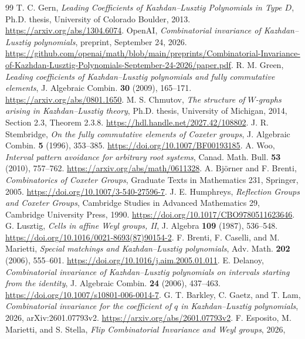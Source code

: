 \documentclass[11pt]{article}
\theoremstyle{definition}\newtheorem{definition}[theorem]{Definition}
\theoremstyle{remark}\newtheorem{remark}[theorem]{Remark}
\begin{document}
\begin{thebibliography}{99}
 T. C. Gern, \emph{Leading Coefficients of
Kazhdan--Lusztig Polynomials in Type $D$}, Ph.D. thesis, University
of Colorado Boulder, 2013. \url{https://arxiv.org/abs/1304.6074}.
 OpenAI, \emph{Combinatorial invariance of
Kazhdan--Lusztig polynomials}, preprint, September 24, 2026.
\url{https://github.com/openai/math/blob/main/preprints/Combinatorial-Invariance-of-Kazhdan-Lusztig-Polynomials-September-24-2026/paper.pdf}.
 R. M. Green, \emph{Leading coefficients of
Kazhdan--Lusztig polynomials and fully commutative elements},
J. Algebraic Combin. \textbf{30} (2009), 165--171.
\url{https://arxiv.org/abs/0801.1650}.
 M. S. Chmutov, \emph{The structure of $W$-graphs
arising in Kazhdan--Lusztig theory}, Ph.D. thesis, University of
Michigan, 2014, Section 2.3, Theorem 2.3.8.
\url{https://hdl.handle.net/2027.42/108802}.
 J. R. Stembridge, \emph{On the fully commutative
elements of Coxeter groups}, J. Algebraic Combin. \textbf{5} (1996),
353--385. \url{https://doi.org/10.1007/BF00193185}.
 A. Woo, \emph{Interval pattern avoidance for arbitrary
root systems}, Canad. Math. Bull. \textbf{53} (2010), 757--762.
\url{https://arxiv.org/abs/math/0611328}.
 A. Bj\"orner and F. Brenti,
\emph{Combinatorics of Coxeter Groups}, Graduate Texts in Mathematics
231, Springer, 2005. \url{https://doi.org/10.1007/3-540-27596-7}.
 J. E. Humphreys, \emph{Reflection Groups and
Coxeter Groups}, Cambridge Studies in Advanced Mathematics 29,
Cambridge University Press, 1990.
\url{https://doi.org/10.1017/CBO9780511623646}.
 G. Lusztig, \emph{Cells in affine Weyl groups, II},
J. Algebra \textbf{109} (1987), 536--548.
\url{https://doi.org/10.1016/0021-8693(87)90154-2}.
 F. Brenti, F. Caselli, and M. Marietti,
\emph{Special matchings and Kazhdan--Lusztig polynomials},
Adv. Math. \textbf{202} (2006), 555--601.
\url{https://doi.org/10.1016/j.aim.2005.01.011}.
 E. Delanoy, \emph{Combinatorial invariance of
Kazhdan--Lusztig polynomials on intervals starting from the identity},
J. Algebraic Combin. \textbf{24} (2006), 437--463.
\url{https://doi.org/10.1007/s10801-006-0014-7}.
 G. T. Barkley, C. Gaetz, and T. Lam,
\emph{Combinatorial invariance for the coefficient of $q$ in
Kazhdan--Lusztig polynomials}, 2026, arXiv:2601.07793v2.
\url{https://arxiv.org/abs/2601.07793v2}.
 F. Esposito, M. Marietti, and S. Stella,
\emph{Flip Combinatorial Invariance and Weyl groups}, 2026,

\end{thebibliography}
\end{document}
